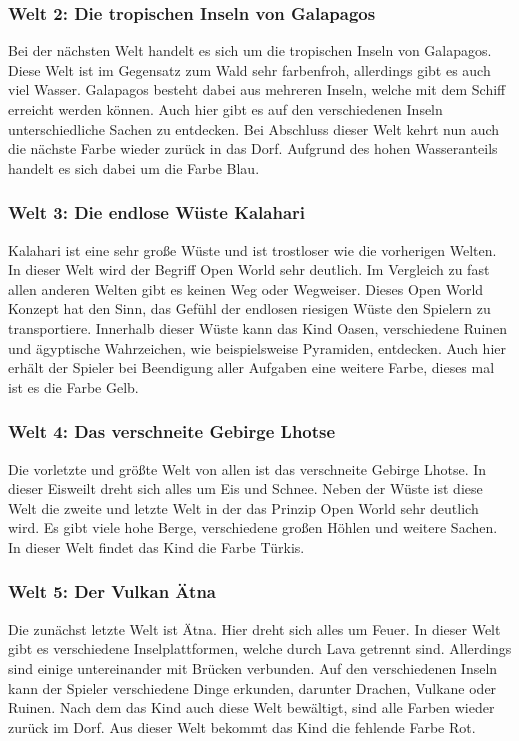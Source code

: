 \subsubsection{Welt 2: Die tropischen Inseln von Galapagos}
	Bei der nächsten Welt handelt es sich um die tropischen Inseln von Galapagos. Diese Welt ist im Gegensatz zum Wald sehr farbenfroh, allerdings gibt es auch viel Wasser. Galapagos besteht dabei aus mehreren Inseln, welche mit dem Schiff erreicht werden können. Auch hier gibt es auf den verschiedenen Inseln unterschiedliche Sachen zu entdecken. Bei Abschluss dieser Welt kehrt nun auch die nächste Farbe wieder zurück in das Dorf. Aufgrund des hohen Wasseranteils handelt es sich dabei um die Farbe Blau.
	
\subsubsection{Welt 3: Die endlose Wüste Kalahari}
	Kalahari ist eine sehr große Wüste und ist trostloser wie die vorherigen Welten. In dieser Welt wird der Begriff Open World sehr deutlich. Im Vergleich zu fast allen anderen Welten gibt es keinen Weg oder Wegweiser. Dieses Open World Konzept hat den Sinn, das Gefühl der endlosen riesigen Wüste den Spielern zu transportiere. Innerhalb dieser Wüste kann das Kind Oasen, verschiedene Ruinen und ägyptische Wahrzeichen, wie beispielsweise Pyramiden, entdecken. Auch hier erhält der Spieler bei Beendigung aller Aufgaben eine weitere Farbe, dieses mal ist es die Farbe Gelb.
	
\subsubsection{Welt 4: Das verschneite Gebirge Lhotse}
	Die vorletzte und größte Welt von allen ist das verschneite Gebirge Lhotse. In dieser Eisweilt dreht sich alles um Eis und Schnee. Neben der Wüste ist diese Welt die zweite und letzte Welt in der das Prinzip Open World sehr deutlich wird. Es gibt viele hohe Berge, verschiedene großen Höhlen und weitere Sachen. In dieser Welt findet das Kind die Farbe Türkis.
	
\subsubsection{Welt 5: Der Vulkan Ätna}
	Die zunächst letzte Welt ist Ätna. Hier dreht sich alles um Feuer. In dieser Welt gibt es verschiedene Inselplattformen, welche durch Lava getrennt sind. Allerdings sind einige untereinander mit Brücken verbunden. Auf den verschiedenen Inseln kann der Spieler verschiedene Dinge erkunden, darunter Drachen, Vulkane oder Ruinen. Nach dem das Kind auch diese Welt bewältigt, sind alle Farben wieder zurück im Dorf. Aus dieser Welt bekommt das Kind die fehlende Farbe Rot.
